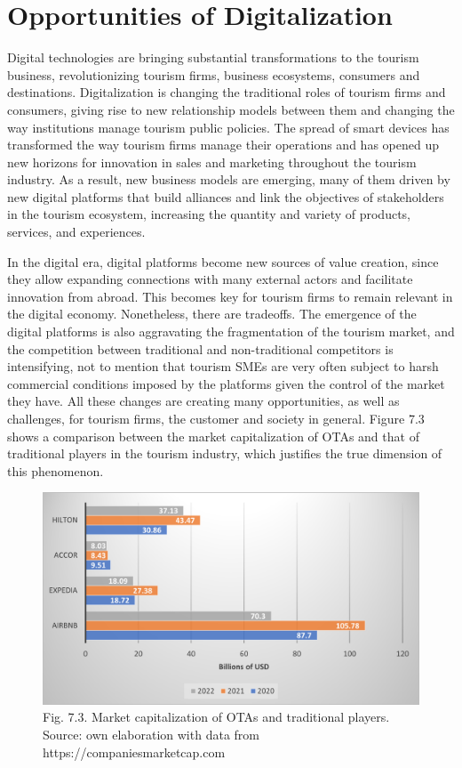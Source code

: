 \documentclass[
  letterpaper,
  DIV=11,
  numbers=noendperiod]{scrreprt}
\begin{document}
\hypertarget{opportunities-of-digitalization}{%
\section{Opportunities of
Digitalization}\label{opportunities-of-digitalization}}

Digital technologies are bringing substantial transformations to the
tourism business, revolutionizing tourism firms, business ecosystems,
consumers and destinations. Digitalization is changing the traditional
roles of tourism firms and consumers, giving rise to new relationship
models between them and changing the way institutions manage tourism
public policies. The spread of smart devices has transformed the way
tourism firms manage their operations and has opened up new horizons for
innovation in sales and marketing throughout the tourism industry. As a
result, new business models are emerging, many of them driven by new
digital platforms that build alliances and link the objectives of
stakeholders in the tourism ecosystem, increasing the quantity and
variety of products, services, and experiences.

In the digital era, digital platforms become new sources of value
creation, since they allow expanding connections with many external
actors and facilitate innovation from abroad. This becomes key for
tourism firms to remain relevant in the digital economy. Nonetheless,
there are tradeoffs. The emergence of the digital platforms is also
aggravating the fragmentation of the tourism market, and the competition
between traditional and non-traditional competitors is intensifying, not
to mention that tourism SMEs are very often subject to harsh commercial
conditions imposed by the platforms given the control of the market they
have. All these changes are creating many opportunities, as well as
challenges, for tourism firms, the customer and society in general.
Figure 7.3 shows a comparison between the market capitalization of OTAs
and that of traditional players in the tourism industry, which justifies
the true dimension of this phenomenon.

\begin{figure}

{\centering \includegraphics{img/fig6.png}

}

\caption{Fig. 7.3. Market capitalization of OTAs and traditional
players. Source: own elaboration with data from
https://companiesmarketcap.com}

\end{figure}
\end{document}
